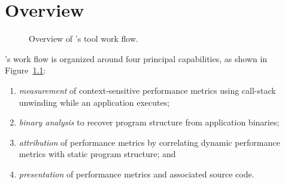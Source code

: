 \documentclass[11pt,letterpaper]{report}
\begin{document}
\chapter{\HPCToolkit{} Overview}


\begin{figure}[t]
\caption{Overview of \HPCToolkit{}'s tool work flow.}

\label{fig:hpctoolkit-overview:a}
\end{figure}

\HPCToolkit{}'s work flow is organized around four principal capabilities, as shown in Figure~\ref{fig:hpctoolkit-overview:a}:
\begin{enumerate}
  \item \emph{measurement} of context-sensitive performance metrics using call-stack unwinding 
while an application executes;
  \item \emph{binary analysis} to recover program structure from application binaries;
  \item \emph{attribution} of performance metrics by correlating dynamic performance metrics with static program structure; and
  \item \emph{presentation} of performance metrics and associated source code.
\end{enumerate}
\end{document}
